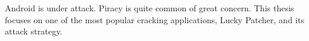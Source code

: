 Android is under attack.
Piracy is quite common of great concern.
\newline
This thesis focuses on one of the most popular cracking applications, Lucky Patcher, and its attack strategy.

